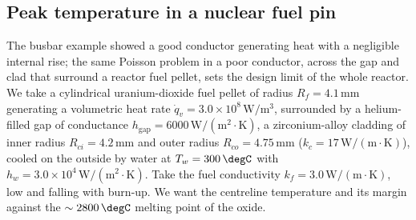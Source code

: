 

\subsection{Peak temperature in a nuclear fuel pin}

The busbar example showed a good conductor generating heat with a
negligible internal rise; the same Poisson problem in a poor conductor,
across the gap and clad that surround a reactor fuel pellet, sets the
design limit of the whole reactor. We take a cylindrical uranium-dioxide
fuel pellet of radius $R_f = 4.1\,\si{\milli\meter}$ generating a
volumetric heat rate $\dot{q}_v = 3.0\times10^8\,\text{W}/\text{m}^3$,
surrounded by a helium-filled gap of conductance $h_{\text{gap}} =
6000\,\text{W}/(\text{m}^2\cdot\si{\kelvin})$, a zirconium-alloy cladding
of inner radius $R_{ci} = 4.2\,\si{\milli\meter}$ and outer radius
$R_{co} = 4.75\,\si{\milli\meter}$ ($k_c = 17\,\text{W}/(\text{m}\cdot
\si{\kelvin})$), cooled on the outside by water at $T_w = 300\,\degC$ with
$h_w = 3.0\times10^4\,\text{W}/(\text{m}^2\cdot\si{\kelvin})$. Take the
fuel conductivity $k_f = 3.0\,\text{W}/(\text{m}\cdot\si{\kelvin})$, low
and falling with burn-up. We want the centreline temperature and its
margin against the $\sim 2800\,\degC$ melting point of the oxide.

